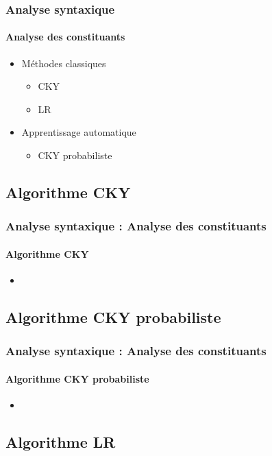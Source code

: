 \documentclass[xcolor=table]{beamer}
\begin{document}
\begin{frame}
\frametitle{Analyse syntaxique}
\framesubtitle{Analyse des constituants}

\begin{itemize}
	\item Méthodes classiques 
	\begin{itemize}
		\item CKY
		\item LR 
	\end{itemize}
	\item Apprentissage automatique 
	\begin{itemize}
		\item CKY probabiliste
	\end{itemize}
\end{itemize}

\end{frame}

\subsection{Algorithme CKY}

\begin{frame}
\frametitle{Analyse syntaxique : Analyse des constituants}
\framesubtitle{Algorithme CKY}

\begin{itemize}
	\item 
\end{itemize}

\end{frame}

\subsection{Algorithme CKY probabiliste}

\begin{frame}
\frametitle{Analyse syntaxique : Analyse des constituants}
\framesubtitle{Algorithme CKY probabiliste}

\begin{itemize}
	\item 
\end{itemize}

\end{frame}

\subsection{Algorithme LR}
\end{document}
